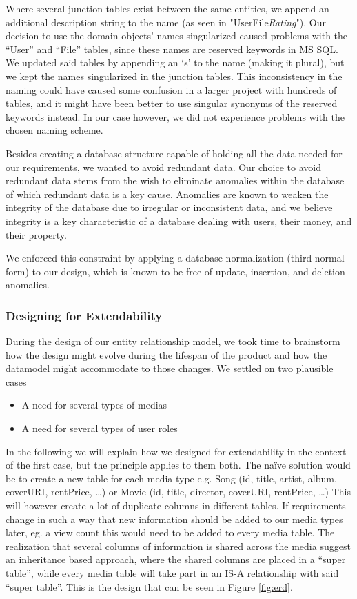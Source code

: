 Where several junction tables exist between the same entities, we append an
additional description string to the name (as seen in
"UserFile\textit{Rating}"). Our decision to use the domain objects' names
singularized caused problems with the “User” and “File” tables, since these
names are reserved keywords in MS SQL. We updated said tables by appending an
‘s’ to the name (making it plural), but we kept the names singularized in the
junction tables. This inconsistency in the naming could have caused some
confusion in a larger project with hundreds of tables, and it might have been
better to use singular synonyms of the reserved keywords instead. In our case
however, we did not experience problems with the chosen naming scheme.

Besides creating a database structure capable of holding all the data needed
for our requirements, we wanted to avoid redundant data. Our choice to avoid
redundant data stems from the wish to eliminate anomalies within the database
of which redundant data is a key cause. Anomalies are known to weaken the
integrity of the database\cite{dbbook} due to irregular or inconsistent data,
and we believe integrity is a key characteristic of a database dealing with
users, their money, and their property.

We enforced this constraint by applying a database normalization (third normal
form) to our design, which is known to be free of update, insertion, and
deletion anomalies.

\subsubsection{Designing for Extendability}
\label{sec:extendability}
During the design of our entity relationship model, we took time to brainstorm how the design might evolve during the lifespan of the product and how the datamodel might accommodate to those changes. We settled on two plausible cases
\begin{itemize}
\item A need for several types of medias
\item A need for several types of user roles
\end{itemize}

In the following we will explain how we designed for extendability in the
context of the first case, but the principle applies to them both. The naïve
solution would be to create a new table for each media type e.g. Song (id,
title, artist, album, coverURI, rentPrice, …) or Movie (id, title, director,
coverURI, rentPrice, …) This will however create a lot of duplicate columns in
different tables. If requirements change in such a way that new information
should be added to our media types later, eg. a view count this would need to
be added to every media table. The realization that several columns of
information is shared across the media suggest an inheritance based approach,
where the shared columns are placed in a “super table”, while every media table
will take part in an IS-A relationship with said “super table”. This is the
design that can be seen in Figure \ref{fig:erd}.

